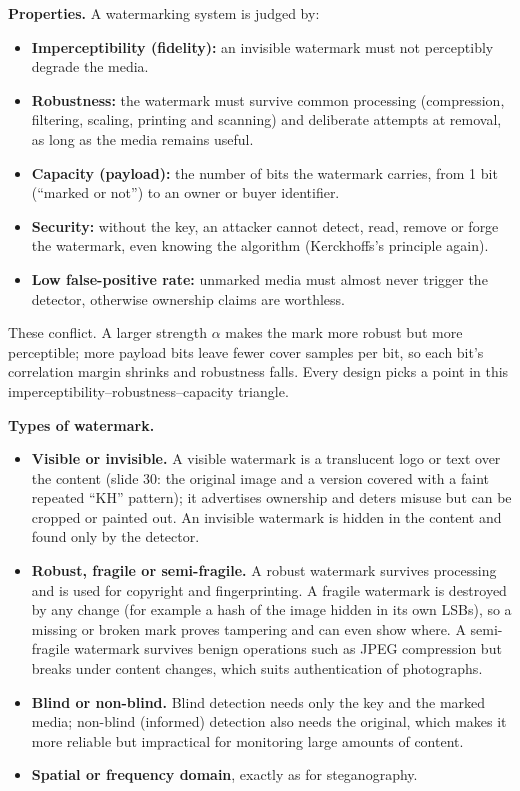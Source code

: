 \textbf{Properties.} A watermarking system is judged by:
\begin{itemize}
  \item \textbf{Imperceptibility (fidelity):} an invisible watermark must not perceptibly degrade the media.
  \item \textbf{Robustness:} the watermark must survive common processing (compression, filtering, scaling, printing and scanning) and deliberate attempts at removal, as long as the media remains useful.
  \item \textbf{Capacity (payload):} the number of bits the watermark carries, from 1 bit (``marked or not'') to an owner or buyer identifier.
  \item \textbf{Security:} without the key, an attacker cannot detect, read, remove or forge the watermark, even knowing the algorithm (Kerckhoffs's principle again).
  \item \textbf{Low false-positive rate:} unmarked media must almost never trigger the detector, otherwise ownership claims are worthless.
\end{itemize}
These conflict. A larger strength $\alpha$ makes the mark more robust but more perceptible; more payload bits leave fewer cover samples per bit, so each bit's correlation margin shrinks and robustness falls. Every design picks a point in this imperceptibility--robustness--capacity triangle.

\textbf{Types of watermark.}
\begin{itemize}
  \item \textbf{Visible or invisible.} A visible watermark is a translucent logo or text over the content (slide 30: the original image and a version covered with a faint repeated ``KH'' pattern); it advertises ownership and deters misuse but can be cropped or painted out. An invisible watermark is hidden in the content and found only by the detector.
  \item \textbf{Robust, fragile or semi-fragile.} A robust watermark survives processing and is used for copyright and fingerprinting. A fragile watermark is destroyed by any change (for example a hash of the image hidden in its own LSBs), so a missing or broken mark proves tampering and can even show where. A semi-fragile watermark survives benign operations such as JPEG compression but breaks under content changes, which suits authentication of photographs.
  \item \textbf{Blind or non-blind.} Blind detection needs only the key and the marked media; non-blind (informed) detection also needs the original, which makes it more reliable but impractical for monitoring large amounts of content.
  \item \textbf{Spatial or frequency domain}, exactly as for steganography.
\end{itemize}

